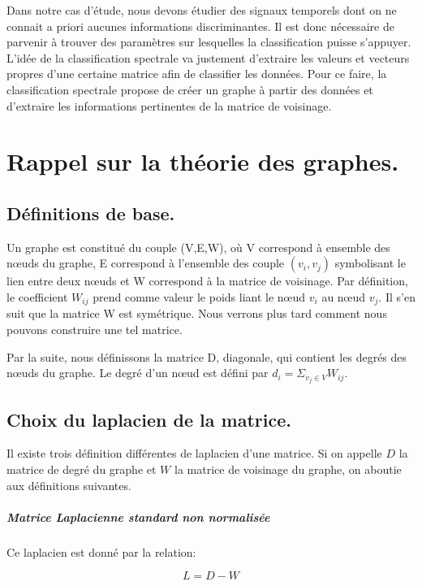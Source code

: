 Dans notre cas d'étude, nous devons étudier des signaux temporels dont on ne connait a priori aucunes informations discriminantes. Il est donc nécessaire de parvenir à trouver des paramètres sur lesquelles la classification puisse s'appuyer. L'idée de la classification spectrale va justement d'extraire les valeurs et vecteurs propres d'une certaine matrice afin de classifier les données. Pour ce faire, la classification spectrale propose de créer un graphe à partir des données et d'extraire les informations pertinentes de la matrice de voisinage.

\chapter{Rappel sur la théorie des graphes.}

\section{Définitions de base.}

Un graphe est constitué du couple (V,E,W), où V correspond à ensemble des nœuds du graphe, E correspond à l'ensemble des couple $(v_i,v_j)$ symbolisant le lien entre deux nœuds et W correspond à la matrice de voisinage. Par définition, le coefficient $W_{ij}$ prend comme valeur le poids liant le nœud $v_i$ au nœud $v_j$. Il s'en suit que la matrice W est symétrique. Nous verrons plus tard comment nous pouvons construire une tel matrice.


Par la suite, nous définissons la matrice D, diagonale, qui contient les degrés des nœuds du graphe. Le degré d'un nœud est défini par $d_i = \Sigma_{v_j \in V} W_{ij}$. 
\section{Choix du laplacien de la matrice.}

Il existe trois définition différentes de laplacien d'une matrice. Si on appelle $D$ la matrice de degré du graphe et $W$ la matrice de voisinage du graphe, on aboutie aux définitions suivantes.

\paragraph{Matrice Laplacienne standard non normalisée}

\medskip 

Ce laplacien est donné par la relation:

\begin{equation}
L = D-W
\end{equation}


